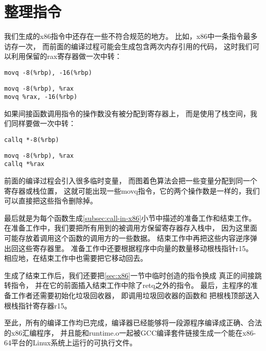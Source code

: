 
\section{整理指令}

我们生成的x86指令中还存在一些不符合规范的地方。
比如，x86中一条指令最多访存一次，
而前面的编译过程可能会生成包含两次内存引用的代码，
这时我们可以利用保留的rax寄存器做一次中转：

\begin{transformation}
\begin{lstlisting}
movq -8(%rbp), -16(%rbp)
\end{lstlisting}
\compilesto
\begin{lstlisting}
movq -8(%rbp), %rax
movq %rax, -16(%rbp)
\end{lstlisting}
\end{transformation}

如果间接函数调用指令的操作数没有被分配到寄存器上，
而是使用了栈空间，我们同样要做一次中转：
\begin{transformation}
\begin{lstlisting}
callq *-8(%rbp)
\end{lstlisting}
\compilesto
\begin{lstlisting}
movq -8(%rbp), %rax
callq *%rax
\end{lstlisting}
\end{transformation}

前面的编译过程会引入很多临时变量，
而图着色算法会把一些变量分配到同一个寄存器或栈位置，
这就可能出现一些movq指令，它的两个操作数是一样的，我们可以直接把这些指令删除掉。

最后就是为每个函数生成\ref{subsec:call-in-x86}小节中描述的准备工作和结束工作。
在准备工作中，我们要把所有用到的被调用方保留寄存器存入栈中，
因为这里面可能存放着调用这个函数的调用方的一些数据。
结束工作中再把这些内容逆序弹出回这些寄存器里。
准备工作中还要根据程序中向量的数量移动根栈指针r15。
相应地，在结束工作中也需要把它移动回去。

生成了结束工作后，我们还要把\ref{sec:x86}一节中临时创造的指令换成
真正的间接跳转指令，
并在它的前面插入结束工作中除了retq之外的指令。
最后，主程序的准备工作者还需要初始化垃圾回收器，
即调用垃圾回收器的函数和
把根栈顶部送入根栈指针寄存器r15。

至此，所有的编译工作均已完成，编译器已经能够将一段源程序编译成正确、合法的x86汇编程序，
并且能和runtime.o一起被GCC编译套件链接生成一个能在x86-64平台的Linux系统上运行的可执行文件。
